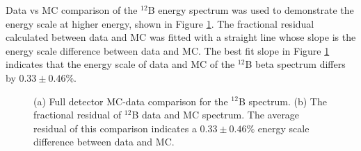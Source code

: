 Data vs MC comparison of the $^{12}$B energy spectrum was used to demonstrate the energy scale at higher energy, shown in Figure \ref{fig:B12final}. 
The fractional residual calculated between data and MC was fitted with a straight line whose slope is the energy scale difference between data and MC. 
The best fit slope in Figure \ref{fig:B12final} indicates that the energy scale of data and MC of the $^{12}$B beta spectrum differs by $0.33 \pm 0.46\%$.

\begin{figure}[h!]
\centering
{} \quad
{} \quad
\caption[Best fit MC compared to data of the $^{12}$B spectrum]{(a) Full detector MC-data comparison for the $^{12}$B spectrum. (b) The fractional residual of $^{12}$B data and MC spectrum. The average residual of this comparison indicates a $0.33 \pm 0.46\%$ energy scale difference between data and MC.}
\label{fig:B12final}
\end{figure}

